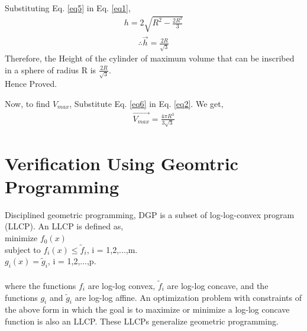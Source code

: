 \documentclass[journal,12pt,twocolumn]{IEEEtran}
\begin{document}
Substituting Eq. \eqref{eq5} in Eq. \eqref{eq1},\\
\begin{align*}
h = 2 \sqrt{R^2 - \frac{2R^2}{3}}
\end{align*} 
\begin{align}
\therefore \vec{h} = \frac{2R}{\sqrt{3}}
\label{eq6}
\end{align}
Therefore, the Height of the cylinder of maximum volume that can be inscribed in a sphere of radius R is $\frac{2R}{\sqrt{3}} $.\\
\vspace{0.25cm}
\centering
Hence Proved.\\
\vspace{0.25cm}
\raggedright
Now, to find $V_{max}$, Substitute Eq. \eqref{eq6} in Eq. \eqref{eq2}. We get,\\
\begin{align*}
\vec{V_{max}} = \frac{4 \pi R^3}{3 \sqrt{3}}
\end{align*} 
\section{Verification Using Geomtric Programming}
\vspace{0.25cm}
\raggedright
Disciplined geometric programming, DGP is a subset of log-log-convex program (LLCP). An LLCP is defined as,\\
\vspace{2cm}
\hspace{2cm} minimize $f_0(x)$\\
\vspace{0.2cm}
\hspace{2cm} subject to $f_i(x) \leq \tilde{f}_i$, i = 1,2,...,m.\\
\vspace{0.2cm}
\hspace{3.8cm} $g_i(x) = \tilde{g}_i$, i = 1,2,...,p.
\begin{align}
\label{eq7}
\end{align}

where the functions $f_i$
				are log-log convex, $\tilde{f}_i$
 are log-log concave, and the functions $g_i$
				and $\tilde{g}_i$
 are log-log affine. An optimization problem with constraints of the above form in which the goal is to maximize or minimize a log-log concave function is also an LLCP. These LLCPs generalize geometric programming.\\

\vspace{0.25cm}
\end{document}
